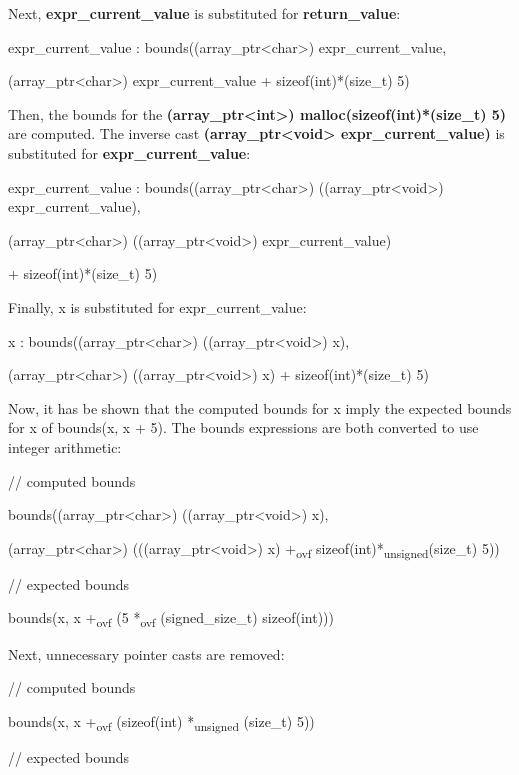 \documentclass[]{article}
\begin{document}
Next, \textbf{expr\_current\_value} is substituted for
\textbf{return\_value}:

expr\_current\_value : bounds((array\_ptr\textless{}char\textgreater{})
expr\_current\_value,

(array\_ptr\textless{}char\textgreater{}) expr\_current\_value +
sizeof(int)*(size\_t) 5)

Then, the bounds for the
\textbf{(array\_ptr\textless{}int\textgreater{})
malloc(sizeof(int)*(size\_t) 5)} are computed. The inverse cast
\textbf{(array\_ptr\textless{}void\textgreater{} expr\_current\_value)}
is substituted for \textbf{expr\_current\_value}:

expr\_current\_value : bounds((array\_ptr\textless{}char\textgreater{})
((array\_ptr\textless{}void\textgreater{}) expr\_current\_value),

(array\_ptr\textless{}char\textgreater{})
((array\_ptr\textless{}void\textgreater{}) expr\_current\_value)

+ sizeof(int)*(size\_t) 5)

Finally, x is substituted for expr\_current\_value:

x : bounds((array\_ptr\textless{}char\textgreater{})
((array\_ptr\textless{}void\textgreater{}) x),

(array\_ptr\textless{}char\textgreater{})
((array\_ptr\textless{}void\textgreater{}) x) + sizeof(int)*(size\_t) 5)

Now, it has be shown that the computed bounds for x imply the expected
bounds for x of bounds(x, x + 5). The bounds expressions are both
converted to use integer arithmetic:

// computed bounds

bounds((array\_ptr\textless{}char\textgreater{})
((array\_ptr\textless{}void\textgreater{}) x),

(array\_ptr\textless{}char\textgreater{})
(((array\_ptr\textless{}void\textgreater{}) x) +\textsubscript{ovf}
sizeof(int)*\textsubscript{unsigned}(size\_t) 5))

// expected bounds

bounds(x, x +\textsubscript{ovf} (5 *\textsubscript{ovf}
(signed\_size\_t) sizeof(int)))

Next, unnecessary pointer casts are removed:

// computed bounds

bounds(x, x +\textsubscript{ovf} (sizeof(int) *\textsubscript{unsigned}
(size\_t) 5))

// expected bounds
\end{document}
